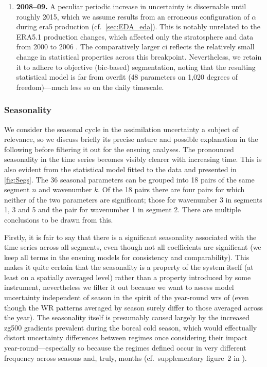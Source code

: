 \begin{enumerate}
    \item \textbf{2008--09.} A peculiar periodic increase in
          uncertainty is discernable until roughly 2015, which we assume results from an
          erroneous configuration of $\alpha$ during \gls{era5} production
          (cf.~\cref{sec:EDA_eda}). This is notably unrelated to the ERA5.1
          production changes, which affected only the stratosphere and data from
          2000 to 2006 \parencite{simmonsGlobalStratosphericTemperature2020}. The
          comparatively larger \gls{ci} reflects the relatively small
          change in statistical properties across this breakpoint. Nevertheless,
          we retain it to adhere to objective (\gls{bic}-based) segmentation,
          noting that the resulting statistical model is far from overfit (48
          parameters on 1,020 degrees of freedom)---much less so on the daily
          timescale.

\end{enumerate}

\subsubsection{Seasonality}
We consider the seasonal cycle in the assimilation uncertainty a subject of relevance, so we discuss briefly its precise nature and possible explanation in the following before filtering it out for the ensuing analyses. The pronounced seasonality in the time series becomes visibly clearer with increasing time. This is also evident from the statistical model fitted to the data and presented in \cref{fig:Segs}. The 36 seasonal parameters can be grouped into 18 pairs of the same segment $n$ and wavenumber $k$. Of the 18 pairs there are four pairs for which neither of the two parameters are significant; those for wavenumber 3 in segments 1, 3 and 5 and the pair for wavenumber 1 in segment 2. There are multiple conclusions to be drawn from this.

Firstly, it is fair to say that there is a significant seasonality associated with the time series across all segments, even though not all coefficients are significant (we keep all terms in the ensuing models for consistency and comparability).
This makes it quite certain that the seasonality is a property of the system itself (at least on a spatially averaged level) rather than a property introduced by some instrument, nevertheless we filter it out because we want to assess model uncertainty independent of season in the spirit of the year-round \glspl{wr} of \textcite{gramsBalancingEuropesWindpower2017} (even though the WR patterns averaged by season surely differ to those averaged across the year). The seasonality itself is presumably caused largely by the increased \gls{zg500} gradients prevalent during the boreal cold season, which would effectually distort uncertainty differences between regimes once considering their impact year-round---especially so because the regimes defined occur in very different frequency across seasons and, truly, months (cf.~supplementary figure~2 in \cite{gramsBalancingEuropesWindpower2017}).

